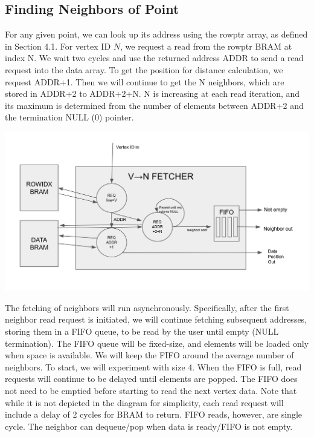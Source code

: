 \documentclass{article}
\begin{document}

\subsection{Finding Neighbors of Point}

For any given point, we can look up its address using the rowptr array, as defined in Section 4.1. For vertex ID $N$, we request a read from the rowptr BRAM at index N. We wait two cycles and use the returned address ADDR to send a read request into the data array. To get the position for distance calculation, we request ADDR+1. Then we will continue to get the N neighbors, which are stored in ADDR+2 to ADDR+2+N. N is increasing at each read iteration, and its maximum is determined from the number of elements between ADDR+2 and the termination NULL (0) pointer.

\includegraphics[width=15cm]{fetch.png}


The fetching of neighbors will run asynchronously. Specifically, after the first neighbor read request is initiated, we will continue fetching subsequent addresses, storing them in a FIFO queue, to be read by the user until empty (NULL termination). The FIFO queue will be fixed-size, and elements will be loaded only when space is available. We will keep the FIFO around the average number of neighbors. To start, we will experiment with size 4. When the FIFO is full, read requests will continue to be delayed until elements are popped. The FIFO does not need to be emptied before starting to read the next vertex data. Note that while it is not depicted in the diagram for simplicity, each read request will include a delay of 2 cycles for BRAM to return. FIFO reads, however, are single cycle. The neighbor can dequeue/pop when data is ready/FIFO is not empty.
\end{document}
